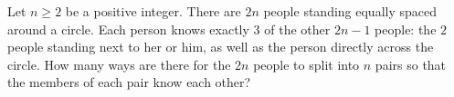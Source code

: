 Let $n\geq2$ be a positive integer. There are $2n$ people standing equally spaced around a circle. Each person knows exactly $3$ of the other $2n-1$ people: the $2$ people standing next to her or him, as well as the person directly across the circle. How many ways are there for the $2n$ people to split into $n$ pairs so that the members of each pair know each other?